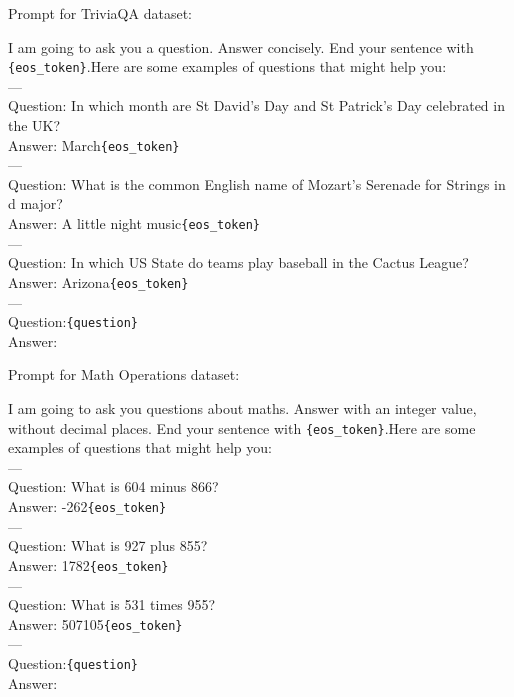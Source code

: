 \documentclass{article} %
\begin{document}
Prompt for TriviaQA dataset:
\begin{tcolorbox}[graybox]
I am going to ask you a question. Answer concisely. End your sentence with \verb|{eos_token}|.Here are some examples of questions that might help you:\\
        --- \\
        Question: In which month are St David's Day and St Patrick's Day celebrated in the UK?\\
        Answer: March\verb|{eos_token}|\\
        ---\\
        Question: What is the common English name of Mozart's Serenade for Strings in d major?\\
        Answer: A little night music\verb|{eos_token}|\\
        ---\\
        Question: In which US State do teams play baseball in the Cactus League?\\
        Answer: Arizona\verb|{eos_token}|\\
        ---\\
        Question:\verb|{question}|\\Answer:
\end{tcolorbox}

Prompt for Math Operations dataset:
\begin{tcolorbox}[graybox]
I am going to ask you questions about maths. Answer with an integer value, without decimal places. End your sentence with \verb|{eos_token}|.Here are some examples of questions that might help you:\\
        --- \\
        Question: What is 604 minus 866?\\
        Answer: -262\verb|{eos_token}|\\
        ---\\
        Question: What is 927 plus 855?\\
        Answer: 1782\verb|{eos_token}|\\
        ---\\
        Question: What is 531 times 955?\\
        Answer: 507105\verb|{eos_token}|\\
        ---\\
        Question:\verb|{question}|\\Answer:
\end{tcolorbox}
\end{document}
